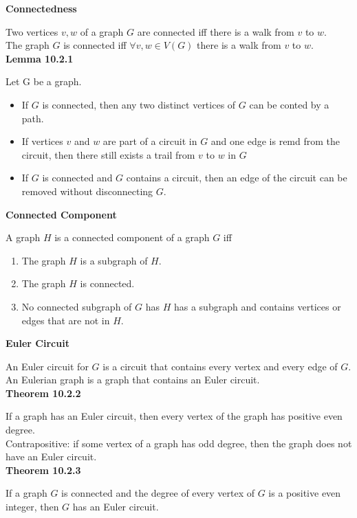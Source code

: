 \documentclass[a4paper]{article}
\newcommand{\subheading}[1]{{\scriptsize\textbf{#1}}}
\begin{document}
\begin{multicols*}{4}
\subheading{Connectedness}

Two vertices $v, w$ of a graph $G$ are connected iff there is a walk from $v$ to
$w$.\\

The graph $G$ is connected iff $\forall v, w \in V(G)$ there is a walk from $v$
to $w$. \\

\subheading{Lemma 10.2.1}

Let G be a graph.
\begin{itemize}[leftmargin=*] \itemsep -0.5em
  \item If $G$ is connected, then any two distinct vertices of $G$ can be
    conted by a path.
  \item If vertices $v$ and $w$ are part of a circuit in $G$ and one edge is
    remd from the circuit, then there still exists a trail from $v$ to $w$ in
    $G$
  \item If $G$ is connected and $G$ contains a circuit, then an edge of the
    circuit can be removed without disconnecting $G$.
\end{itemize}

\subheading{Connected Component}

A graph $H$ is a connected component of a graph $G$ iff
\begin{enumerate} \itemsep -0.5em
 \item The graph $H$ is a subgraph of $H$.
 \item The graph $H$ is connected.
 \item No connected subgraph of $G$ has $H$ has a subgraph and contains
   vertices or edges that are not in $H$.
\end{enumerate}

\subheading{Euler Circuit}

An Euler circuit for $G$ is a circuit that contains every vertex and every edge
of $G$. An Eulerian graph is a graph that contains an Euler circuit.\\

\subheading{Theorem 10.2.2}

If a graph has an Euler circuit, then every vertex of the graph has positive
even degree.\\

Contrapositive: if some vertex of a graph has odd degree, then the
graph does not have an Euler circuit.\\

\subheading{Theorem 10.2.3}

If a graph $G$ is connected and the degree of every vertex of $G$ is a positive
even integer, then $G$ has an Euler circuit.\\


\end{multicols*}
\end{document}
